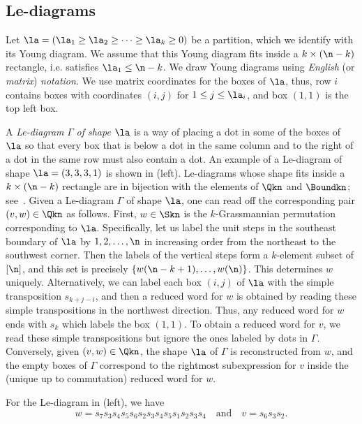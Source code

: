 \subsection{Le-diagrams}\label{sec:Le-diags}
Let $\la=(\la_1\geq\la_2\geq\cdots\geq\la_k\geq0)$ be a partition, which we identify with its Young diagram. We assume that this Young diagram fits inside a $k\times (\n-k)$ rectangle, i.e.  satisfies $\la_1\leq \n-k$. We draw Young diagrams using \emph{English} (or \emph{matrix}) \emph{notation}. We use matrix coordinates for the boxes of $\la$, thus, row $i$ contains boxes with coordinates $(i,j)$ for $1\leq j\leq \la_i$, and box $(1,1)$ is the top left box.

A \emph{Le-diagram} $\Gamma$ \emph{of shape $\la$} is a way of placing a dot in some of the boxes of $\la$ so that every box that is below a dot in the same column and to the right of a dot in the same row must also contain a dot.  
%
 An example of a Le-diagram of shape $\la=(3,3,3,1)$ is shown in (left). Le-diagrams whose shape fits inside a $k\times(\n-k)$ rectangle are in bijection with the elements of $\Qkn$ and $\Boundkn$; see~\cite[Section~19]{Pos}. Given a Le-diagram $\Gamma$ of shape $\la$, one can read off the corresponding pair $(v,w)\in\Qkn$ as follows. First, $w\in\Skn$ is the $k$-Grassmannian permutation corresponding to $\la$. Specifically, let us label the unit steps in the southeast boundary of $\la$ by $1,2,\dots,\n$ in increasing order from the northeast to the southwest corner. Then the labels of the vertical steps form a $k$-element subset of $[\n]$, and this set is precisely $\{w(\n-k+1),\dots,w(\n)\}$. This determines $w$ uniquely. Alternatively, we can label each box $(i,j)$ of $\la$ with the simple transposition $s_{k+j-i}$, and then a reduced word for $w$ is obtained by reading these simple transpositions in the northwest direction. Thus, any reduced word for $w$ ends with $s_k$ which labels the box $(1,1)$. To obtain a reduced word for $v$, we read these simple transpositions but ignore the ones labeled by dots in $\Gamma$. Conversely, given $(v,w)\in\Qkn$, the shape $\la$ of $\Gamma$ is reconstructed from $w$, and the empty boxes of $\Gamma$ correspond to the rightmost subexpression for $v$ inside the (unique up to commutation) reduced word for $w$.
\begin{example}
For the Le-diagram in (left), we have 
\begin{equation*}%
w= s_7 s_3 s_4 s_5 s_6 s_2 s_3 s_4 s_5 s_1 s_2 s_3 s_4
\quad\text{and}\quad
v= s_6 s_3 s_2.
\end{equation*}
\end{example}

